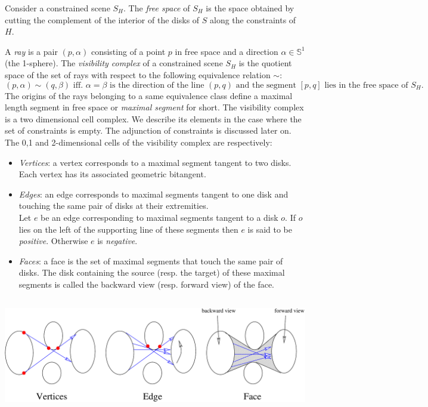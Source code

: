 Consider a constrained scene $S_H$. The \emph{free space} of $S_H$ is the
space obtained by cutting the complement of the interior of the disks of $S$
along the constraints of $H$.

A \emph{ray} is a pair $(p,\alpha)$ consisting of a point $p$ in free space
and a direction $\alpha \in \mathbb{S}^1$ (the 1-sphere).  The
\emph{visibility complex} of a constrained scene $S_H$ is the quotient
space of the set of rays with respect to the following equivalence relation
$\sim$:
\begin{equation}
(p,\alpha) \sim (q,\beta) \textrm{ iff. } \alpha = \beta \textrm{ is the
direction of the line $(p,q)$ and the segment } [p,q] \textrm{ lies in the
free space of } S_H.
\end{equation}
The origins of the rays belonging to a same equivalence class define a
maximal length segment in free space or \emph{maximal segment} for short.
The visibility complex is a two dimensional cell complex. We describe its
elements in the case where the set of constraints is empty. The adjunction
of constraints is discussed later on. The 0,1 and 2-dimensional cells of
the visibility complex are respectively:
\begin{itemize}
    \item \emph{Vertices}: a vertex corresponds to a maximal segment tangent to
    two disks. Each vertex has its associated geometric bitangent.
    \item \emph{Edges}: an edge corresponds to maximal segments tangent to
    one disk and touching the same pair of disks at their extremities. \\
    Let $e$ be an edge corresponding to maximal segments tangent to a disk
    $o$.  If $o$ lies on the left of the supporting line of these segments
    then $e$ is said to be \emph{positive}. Otherwise $e$ is
    \emph{negative}.
    \item \emph{Faces}: a face is the set of maximal segments that touch the
    same pair of disks. The disk containing the source (resp. the target) of 
    these maximal segments is called the backward view (resp. forward view) of 
    the face.
\end{itemize}

\begin{ccTexOnly}
    \begin{center}
        \includegraphics[height=5cm,width=\linewidth]{Visibility_complex_2/fig/vis-complex}%
    \end{center}
\end{ccTexOnly}

